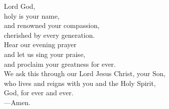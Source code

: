 \prayer


\begin{prayerverse}
Lord God,\\
holy is your name,\\
and renowned your compassion,\\
cherished by every generation.\\
Hear our evening prayer\\
and let us sing your praise,\\
and proclaim your greatness for ever.\\
We ask this through our Lord Jesus Christ, your Son,\\
who lives and reigns with you and the Holy Spirit,\\
God, for ever and ever.\\
{\color{red}---\thinspace}Amen.
\end{prayerverse}

